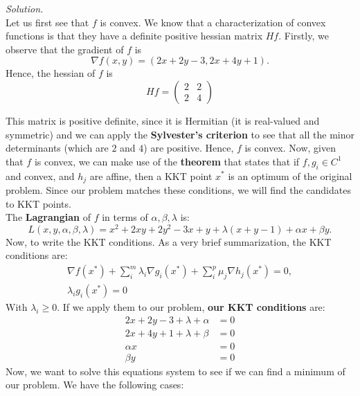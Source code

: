 \documentclass[a4paper]{article}
\newenvironment{solution}
    {\textit{Solution.}\\}
    {}
\begin{document}
\begin{solution}
  Let us first see that \(f\) is convex. We know that a characterization of convex functions is that they have a definite positive hessian matrix \(Hf\). Firstly, we observe that the gradient of \(f\) is
  \[
    \nabla f(x,y) = \left( 2x + 2y - 3, 2x + 4y + 1\right).
  \]
  Hence, the hessian of \(f\) is
  \[
    Hf = \begin{pmatrix} 2 & 2 \\ 2 & 4 \end{pmatrix}
  \]

  This matrix is positive definite, since it is Hermitian (it is real-valued and symmetric) and we can apply the \textbf{Sylvester's criterion} to see that all the minor determinants (which are \(2\) and \(4\)) are positive. Hence, \(f\) is convex. Now, given that \(f\) is convex, we can make use of the \textbf{theorem} that states that if \(f,g_{i} \in C^{1}\) and convex, and \(h_{j}\) are affine, then a KKT point \(x^{*}\) is an optimum of the original problem. Since our problem matches these conditions, we will find the candidates to KKT points.\\

  The \textbf{Lagrangian} of \(f\) in terms of \(\alpha,\beta,\lambda\) is:
  \[
    L(x,y,\alpha,\beta,\lambda) = x^{2} + 2xy + 2y^{2} - 3x + y + \lambda(x+y - 1) + \alpha x + \beta y .
  \]
  Now, to write the KKT conditions. As a very brief summarization, the KKT conditions are:
  \begin{align*}
    \nabla f(x^{*}) + \sum_{i}^m\lambda_{i} \nabla g_{i}(x^*) + \sum_{i}^p\mu_{j} \nabla h_{j}(x^*) = 0, \\
    \lambda_{i}g_{i}(x^*) = 0
  \end{align*}
  With \(\lambda_{i} \geq 0\). If we apply them to our problem, \textbf{our KKT conditions} are:
  \begin{align*}
    2x + 2y - 3 + \lambda + \alpha & = 0 \\
    2x + 4y + 1 +  \lambda + \beta & = 0 \\
    \alpha x                       & = 0 \\
    \beta y                        & = 0
  \end{align*}
  Now, we want to solve this equations system to see if we can find a minimum of our problem. We have the following cases:


\end{solution}
\end{document}
